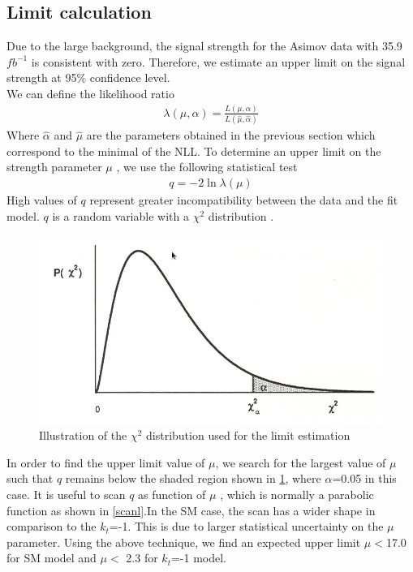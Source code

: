 \begin{linenumbers}
\section{Limit calculation}
Due to the large background, the signal strength for the Asimov data with 35.9 $fb^{-1}$ is consistent with zero.
Therefore, we estimate an upper limit on the signal strength at 95$\%$  confidence level.\\

We can define the likelihood ratio
\begin{align}
\lambda(\mu,\alpha)=\frac{L(\mu,\alpha)}{L(\hat{\mu},\hat{\alpha})}
\end{align}
Where $\hat{\alpha}$ and $\hat{\mu}$ are the parameters obtained in the previous section which correspond to the minimal of the NLL.
To determine an upper limit on the strength parameter $\mu$ , we use the following statistical test
\begin{align}
q=  -2\ln{\lambda(\mu)} 
\end{align}
High values of $q$ represent greater incompatibility between the data and the fit model.
$q$ is a random variable with a $\chi^2$ distribution \cite{asimov}.


\begin{figure}[ht!]
	\centering
	\includegraphics[scale=0.5]{Chapter4/chi_squared.png}
	\caption{Illustration of the $\chi^2$ distribution used for the limit estimation}
\label{chi}
\end{figure}
 
In order to find the upper limit value of $\mu$, we search for the largest value of $\mu$  such that $q$ remains below the shaded region shown in \ref{chi}, where $\alpha$=0.05 in this case. 
It is useful to scan $q$ as function of $\mu$ , which is normally a parabolic function as shown in \ref{scanl}.In the SM case, the scan has a wider shape in comparison to the $k_t$=-1. This is due to larger statistical uncertainty on the $\mu$ parameter. 
Using the above technique, we find an expected upper limit $\mu < $17.0 for SM model and $\mu < $ 2.3 for $k_t$=-1 model. 



\end{linenumbers}
